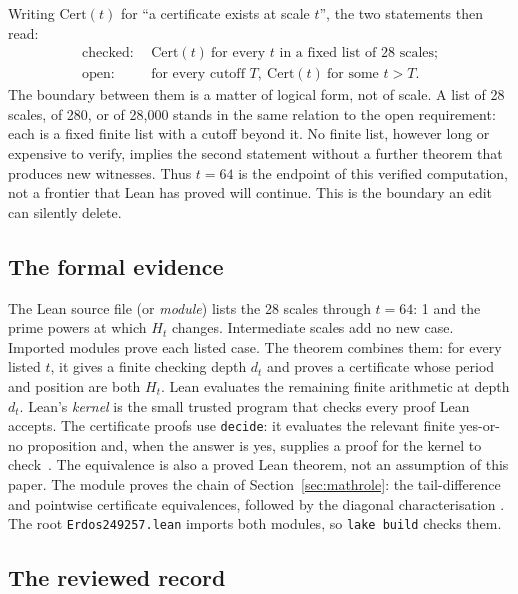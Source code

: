 \documentclass[11pt]{article}
\begin{document}
Writing $\mathrm{Cert}(t)$ for ``a certificate exists at scale $t$'', the
two statements then read:
\begin{align*}
\text{checked:}&\ \ \mathrm{Cert}(t)\ \text{for every $t$ in a fixed list of
28 scales;}\\
\text{open:}&\ \ \text{for every cutoff }T,\ \mathrm{Cert}(t)\ \text{for
some }t>T.
\end{align*}
The boundary between them is a matter of logical form, not of scale.
A list of 28 scales, of 280, or of 28{,}000 stands
in the same relation to the open requirement: each is a fixed finite list
with a cutoff beyond it.  No
finite list, however long or expensive to verify, implies the second
statement without a further theorem that produces new witnesses.  Thus
$t=64$ is the endpoint of this verified computation, not a frontier that
Lean has proved will continue.  This is the boundary an edit can
silently delete.

\subsection{The formal evidence}\label{sec:formal-evidence}

The Lean source file (or \emph{module})
lists the 28 scales through $t=64$: 1 and the prime powers at which $H_t$
changes.  Intermediate scales add no new case.  Imported modules prove each
listed case.  The theorem
 combines them: for every
listed $t$, it gives a finite checking depth $d_t$ and proves a certificate
whose period and position are both $H_t$.  Lean evaluates the remaining finite
arithmetic at depth $d_t$.  Lean's \emph{kernel} is the small trusted program
that checks every proof Lean accepts.  The certificate proofs use \texttt{decide}:
it evaluates the relevant finite yes-or-no proposition and, when the answer is
yes, supplies a proof for the kernel to check~\cite{leanapi}.  The equivalence is also
a proved Lean theorem, not an assumption of this paper.  The module
 proves the chain of
Section~\ref{sec:mathrole}: the tail-difference and pointwise certificate
equivalences, followed by the diagonal characterisation
.
The root \texttt{Erdos249257.lean} imports both modules, so
\texttt{lake build} checks them.

\subsection{The reviewed record}\label{sec:record}
\end{document}
